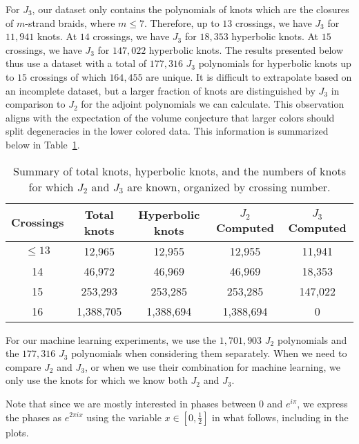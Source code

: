 \documentclass[11pt]{article}
\begin{document}
For $J_3$, our dataset only contains the polynomials of knots which are the closures of $m$-strand braids, where $m\leq 7$.
Therefore, up to $13$ crossings, we have $J_3$ for $11{,} 941$ knots.
At $14$ crossings, we have $J_3$ for $18{,} 353$ hyperbolic knots.
At $15$ crossings, we have $J_3$ for $147{,} 022$ hyperbolic knots.
The results presented below thus use a dataset with a total of $177,316$ $J_3$ polynomials for hyperbolic knots up to $15$ crossings of which $164,455$ are unique.
It is difficult to extrapolate based on an incomplete dataset, but a larger fraction of knots are distinguished by $J_3$ in comparison to $J_2$ for the adjoint polynomials we can calculate.
This observation aligns with the expectation of the volume conjecture that larger colors should split degeneracies in the lower colored data.
This information is summarized below in Table~\ref{table:knotdata}.

\begin{table}[h!]
\centering
\begin{tabular}{c|cccc}
\hline
\textbf{Crossings} & \textbf{Total knots} & \textbf{Hyperbolic knots} & \textbf{$J_2$ Computed} & \textbf{$J_3$ Computed} \\
\hline
$\leq 13$ & 12{,}965 & 12{,}955 & 12{,}955 & 11{,}941 \\
14        & 46{,}972      & 46{,}969  & 46{,}969  & 18{,}353 \\
15        & 253{,}293      & 253{,}285 & 253{,}285 & 147{,}022 \\
16        & 1{,}388{,}705      & 1{,}388{,}694 & 1{,}388{,}694 & 0 \\
\hline
\end{tabular}
\caption{Summary of total knots, hyperbolic knots, and the numbers of knots for which $J_2$ and $J_3$ are known, organized by crossing number.}
\label{table:knotdata}
\end{table}

For our machine learning experiments, we use the $1{,} 701{,} 903$ $J_2$ polynomials and the $177{,} 316$ $J_3$ polynomials when considering them separately.
When we need to compare $J_2$ and $J_3$, or when we use their combination for machine learning, we only use the knots for which we know both $J_2$ and $J_3$.  

Note that since we are mostly interested in phases between $0$ and $e^{i\pi}$, we express the phases as $e^{2\pi ix}$ using the variable $x\in[0,\frac12]$ in what follows, including in the plots.
\end{document}
